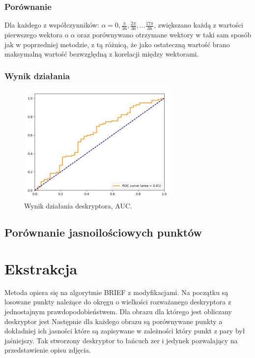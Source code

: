 \documentclass[a4paper,11pt]{article}
\begin{document}
\subsubsection{Porównanie}
Dla każdego z współczynników: $\alpha = 0, \frac{\pi}{36}, \frac{2\pi}{36},...\frac{17\pi}{36}$, zwiększano każdą z wartości pierwszego wektora o $\alpha$ oraz porównywano otrzymane wektory w taki sam sposób jak w poprzedniej metodzie, z tą różnicą, że jako ostateczną wartość brano maksymalną wartość bezwzględną z korelacji między wektorami.


\subsubsection{Wynik działania}

\begin{figure}[H]
\begin{center}
\includegraphics[width=0.7\textwidth]{./img/max_on_circle.png}
\end{center}
\caption{Wynik działania deskryptora, AUC.}
\end{figure}


\subsection{Porównanie jasnoilościowych punktów}

\section{Ekstrakcja}
Metoda opiera się na algorytmie BRIEF z modyfikacjami.
Na początku są losowane punkty należące do okręgu o wielkości rozważanego deskryptora z jednostajnym prawdopodobieństwem. Dla obrazu dla którego jest obliczany deskryptor jest  %
Następnie dla każdego obrazu są porównywane punkty a dokładniej ich jasności które są zapisywane w zależności który punkt z pary był jaśniejszy. Tak stworzony deskryptor to łańcuch zer i jedynek pozwalający na przedstawienie opisu zdjęcia. 
\end{document}
